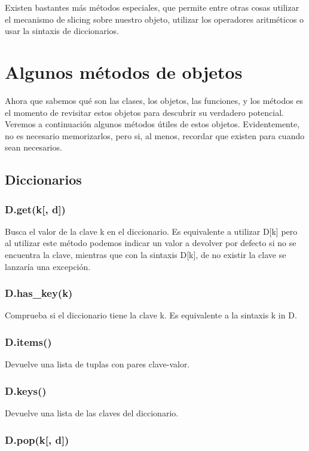 \documentclass[12pt, twoside]{report}
\begin{document}
Existen bastantes más métodos especiales, que permite entre otras cosas utilizar el mecanismo de slicing sobre nuestro objeto, utilizar los operadores aritméticos o usar la sintaxis de diccionarios.

\section{Algunos métodos de objetos}

Ahora que sabemos qué son las clases, los objetos, las funciones, y los métodos es el momento de revisitar estos objetos para descubrir su verdadero potencial.
Veremos a continuación algunos métodos útiles de estos objetos. Evidentemente, no es necesario memorizarlos, pero si, al menos, recordar que existen para cuando sean necesarios.

\subsection{Diccionarios}

\subsubsection{D.get(k[, d])}
Busca el valor de la clave k en el diccionario. Es equivalente a utilizar D[k] pero al utilizar este método podemos indicar un valor a devolver por defecto si no se encuentra la clave, mientras que con la sintaxis D[k], de no existir la clave se lanzaría una excepción.

\subsubsection{D.has\_key(k)}

Comprueba si el diccionario tiene la clave k. Es equivalente a la sintaxis k in D.

\subsubsection{D.items()}

Devuelve una lista de tuplas con pares clave-valor.

\subsubsection{D.keys()}

Devuelve una lista de las claves del diccionario.

\subsubsection{D.pop(k[, d])}
\end{document}
